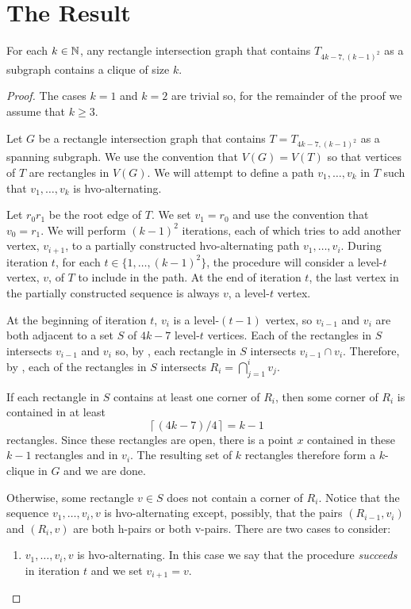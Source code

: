 \documentclass[lotsofwhite]{patmorin}
\newcommand{\iters}{(k-1)^2}
\begin{document}
\section{The Result}

\begin{thm}
  For each $k\in \mathbb{N}$, any rectangle intersection graph that contains
  $T_{4k-7,\iters}$ as a subgraph contains a clique of size $k$.
\end{thm}

\begin{proof}
  The cases $k=1$ and $k=2$ are trivial so, for the remainder of the proof
  we assume that $k\ge 3$.

  Let $G$ be a rectangle intersection graph that contains
  $T=T_{4k-7,\iters}$ as a spanning subgraph.  We use the convention that
  $V(G)=V(T)$ so that vertices of $T$ are rectangles in $V(G)$.  
  We will attempt to define a path $v_1,\ldots,v_k$ in $T$ such that
  $v_1,\ldots,v_k$ is hvo-alternating. 

  Let $r_0r_1$ be the root edge of $T$. We set $v_1=r_0$ and use the convention
  that $v_0=r_1$.  We will perform $\iters$ iterations, each of which
  tries to add another vertex, $v_{i+1}$, to a partially constructed
  hvo-alternating path $v_1,\ldots,v_i$. During iteration $t$, for
  each $t\in\{1,\ldots,\iters\}$, the procedure will consider a
  level-$t$ vertex, $v$, of $T$ to include in the path.  At the end of
  iteration $t$, the last vertex in the partially constructed sequence
  is always $v$, a level-$t$ vertex.

  At the beginning of iteration $t$, $v_i$ is a level-$(t-1)$ vertex, so
  $v_{i-1}$ and $v_i$ are both adjacent to a set $S$ of $4k-7$ level-$t$
  vertices.  Each of the rectangles in $S$ intersects $v_{i-1}$ and
  $v_i$ so, by , each rectangle in $S$ intersects
  $v_{i-1}\cap v_i$.  Therefore, by , each of
  the rectangles in $S$ intersects $R_i=\bigcap_{j=1}^i v_j$.

  If each rectangle in $S$ contains at least one corner of $R_i$, then
  some corner of $R_i$ is contained in at least
  \[
         \left\lceil(4k-7)/4\right\rceil = k-1
  \]
  rectangles.  Since these rectangles are open, there is a point $x$
  contained in these $k-1$ rectangles and in $v_{i}$.  The resulting set
  of $k$ rectangles therefore form a $k$-clique in $G$ and we are done.

  Otherwise, some rectangle $v\in S$ does not contain a corner of $R_i$.
  Notice that the sequence $v_1,\ldots,v_i,v$ is hvo-alternating except,
  possibly, that the pairs $(R_{i-1},v_i)$ and $(R_i,v)$ are both h-pairs
  or both v-pairs.  There are two cases to consider:
  \begin{enumerate}
     \item $v_1,\ldots,v_i,v$ is hvo-alternating. In this
       case we say that the procedure \emph{succeeds} in iteration $t$
       and we set $v_{i+1}=v$.


\end{enumerate}
\end{proof}
\end{document}
